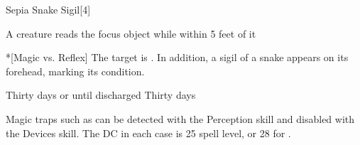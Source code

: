 \begin{spellsection}{Sepia Snake Sigil}[4]
    \begin{spellheader}
    \end{spellheader}
    \begin{spellcontent}
        \begin{spelltargetinginfo}
        \end{spelltargetinginfo}
        \begin{spelleffects}

            \spellline
            \begin{spelltrigger}{A creature reads the focus object while within 5 feet of it}
                \begin{spelltarget}*[Magic vs. Reflex]
                    \spellsuccess The target is \slowed. In addition, a sigil of a snake appears on its forehead, marking its condition.
                \end{spelltarget}
            \end{spelltrigger}
            \spelldur Thirty days or until discharged
            \spelldur Thirty days
        \end{spelleffects}
    \end{spellcontent}
    \begin{spellfooter}
        \spellnotes Magic traps such as  can be detected with the Perception skill and disabled with the Devices skill. The DC in each case is 25 \add spell level, or 28 for .
    \end{spellfooter}
\end{spellsection}

